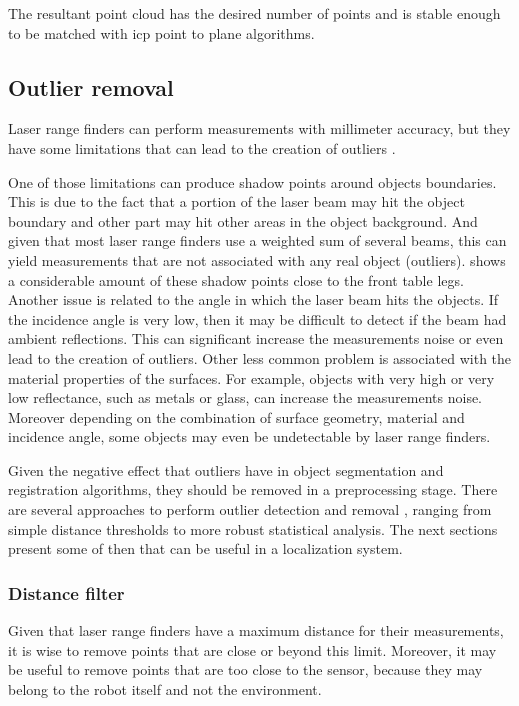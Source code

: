 The resultant point cloud has the desired number of points and is stable enough to be matched with \gls{icp} point to plane algorithms.


\subsection{Outlier removal}

Laser range finders can perform measurements with millimeter accuracy, but they have some limitations that can lead to the creation of outliers \cite{Sotoodeh2006}.

One of those limitations can produce shadow points around objects boundaries. This is due to the fact that a portion of the laser beam may hit the object boundary and other part may hit other areas in the object background. And given that most laser range finders use a weighted sum of several beams, this can yield measurements that are not associated with any real object (outliers).  shows a considerable amount of these shadow points close to the front table legs. Another issue is related to the angle in which the laser beam hits the objects. If the incidence angle is very low, then it may be difficult to detect if the beam had ambient reflections. This can significant increase the measurements noise or even lead to the creation of outliers. Other less common problem is associated with the material properties of the surfaces. For example, objects with very high or very low reflectance, such as metals or glass, can increase the measurements noise. Moreover depending on the combination of surface geometry, material and incidence angle, some objects may even be undetectable by laser range finders.

Given the negative effect that outliers have in object segmentation and registration algorithms, they should be removed in a preprocessing stage. There are several approaches to perform outlier detection and removal \cite{YangZhang2010}, ranging from simple distance thresholds to more robust statistical analysis. The next sections present some of then that can be useful in a localization system.


\subsubsection{Distance filter}

Given that laser range finders have a maximum distance for their measurements, it is wise to remove points that are close or beyond this limit. Moreover, it may be useful to remove points that are too close to the sensor, because they may belong to the robot itself and not the environment.

